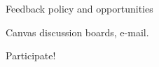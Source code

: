 \begin{frame}{Feedback policy and opportunities}
\begin{itemize}
{  \item Canvas discussion boards, e-mail.
  \begin{itemize}
  {\scriptsize
    \item {\color{red}Participate!}
  }
  \end{itemize}
  
}
\end{itemize} 
    
\end{frame}
